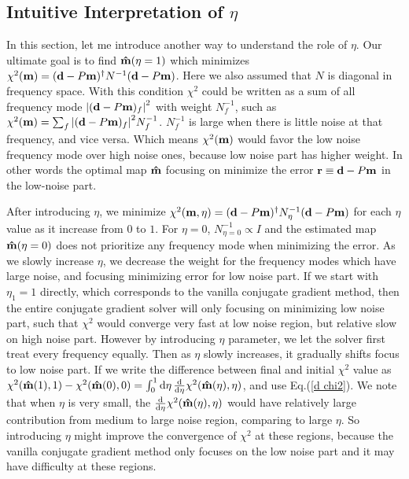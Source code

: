 \documentclass[twocolumn,linenumbers]{aastex631}
\newcommand{\vbd}{\vb{d}}
\newcommand{\vbm}{\vb{m}}
\newcommand{\inv}[1]{#1^{-1}}
\newcommand{\hatm}{\vb{\hat{m}}}
\newcommand{\Nbar}{\bar{N}}
\newcommand{\Neta}{N_{\eta}}
\begin{document}
\subsection{Intuitive Interpretation of $\eta$}\label{intuitive interp}
In this section, let me introduce another way to understand the role of $\eta$.
Our ultimate goal is to find $\hatm(\eta=1)$ which minimizes 
$\chi^2(\vbm) = (\vbd - P\vbm)^{\dagger} \inv{N} (\vbd - P\vbm)$.
Here we also assumed that $N$ is diagonal in frequency space.
With this condition $\chi^2$ could be written as a sum of all frequency mode 
$\qty|(\vbd-P\vbm)_f|^2$ with weight $\inv{N}_f$, such as
$\chi^2(\vbm) = \sum_f \qty|(\vbd-P\vbm)_f|^2 \inv{N}_f$.
$\inv{N}_f$ is large when there is little noise at that frequency,
and vice versa.
Which means $\chi^2(\vbm)$ would favor the low noise frequency mode over high 
noise ones, because low noise part has higher weight.
In other words the optimal map $\hatm$ focusing on minimize the error
$\vb{r} \equiv \vbd - P\vbm$ in the low-noise part.

After introducing $\eta$, we minimize
$\chi^2(\vbm,\eta)=(\vbd-P\vbm)^{\dagger} N_{\eta}^{-1} (\vbd - P\vbm)$
for each $\eta$ value as it increase from $0$ to $1$.
For $\eta=0$, $N^{-1}_{\eta=0} \propto I$ and the estimated map $\hatm(\eta=0)$
does not prioritize any frequency mode when minimizing the error.
As we slowly increase $\eta$, we decrease the weight for the frequency modes
which have large noise, and focusing minimizing error for low noise part.
If we start with $\eta_1=1$ directly, which corresponds to the vanilla conjugate
gradient method, then the entire conjugate gradient solver
will only focusing on minimizing low noise part, such that $\chi^2$ would
converge very fast at low noise region, but relative slow on high noise part.
However by introducing $\eta$ parameter, we let the solver first treat every
frequency equally.
Then as $\eta$ slowly increases, it gradually shifts focus to low noise
part.
If we write the difference between final and initial $\chi^2$ value as
$\chi^2(\hatm(1),1) - \chi^2(\hatm(0),0) = \int_0^1 \dd{\eta}
\dv{\eta} \chi^2(\hatm(\eta),\eta)$,
and use Eq.(\ref{d chi2}).
We note that when $\eta$ is very small, 
the $\dv{\eta}\chi^2(\hatm(\eta),\eta)$ would have relatively large
contribution from medium to large noise region, comparing to large $\eta$.
So introducing $\eta$ might improve the convergence of $\chi^2$ at these
regions, because the vanilla conjugate gradient method only focuses on the low noise
part and it may have difficulty at these regions.
\end{document}
